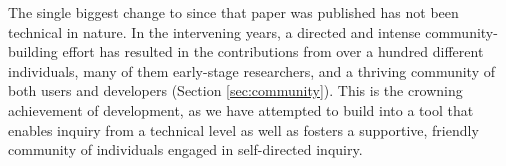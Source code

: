 The single biggest change to \yt{} since that paper was published has not been
technical in nature.  In the intervening years, a directed and intense
community-building effort has resulted in the contributions from over a hundred
different individuals, many of them early-stage researchers, and a thriving
community of both users and developers (Section \ref{sec:community}).  This is
the crowning achievement of development, as we have attempted to build \yt{}
into a tool that enables inquiry from a technical level as well as fosters a
supportive, friendly community of individuals engaged in self-directed inquiry.
